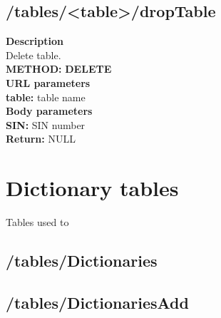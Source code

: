 \documentclass[a4paper, 12pt]{report}
\begin{document}
\subsection{/tables/<table>/dropTable}
\textbf{\color{redText} Description} \\
Delete table. \\
\textbf{\color{redText} METHOD: } \textbf{DELETE} \\
\textbf{\color{redText} URL parameters} \\
\textbf{table: } table name\\
\textbf{\color{redText} Body parameters} \\
\textbf{SIN: } SIN number\\
\textbf{\color{redText} Return: } NULL

\section{Dictionary tables}
Tables used to 
\subsection{/tables/Dictionaries}
\subsection{/tables/DictionariesAdd}
\end{document}
